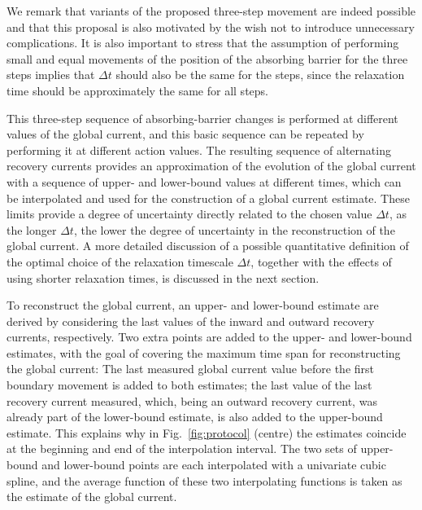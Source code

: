 We remark that variants of the proposed three-step movement are indeed possible and that this proposal is also motivated by the wish not to introduce unnecessary complications. It is also important to stress that the assumption of performing small and equal movements of the position of the absorbing barrier for the three steps implies that $\Delta t$ should also be the same for the steps, since the relaxation time should be approximately the same for all steps. 

This three-step sequence of absorbing-barrier changes is performed at different values of the global current, and this basic sequence can be repeated by performing it at different action values. The resulting sequence of alternating recovery currents provides an approximation of the evolution of the global current with a sequence of upper- and lower-bound values at different times, which can be interpolated and used for the construction of a global current estimate. These limits provide a degree of uncertainty directly related to the chosen value $\Delta t$, as the longer $\Delta t$, the lower the degree of uncertainty in the reconstruction of the global current. A more detailed discussion of a possible quantitative definition of the optimal choice of the relaxation timescale $\Delta t$, together with the effects of using shorter relaxation times, is discussed in the next section.

To reconstruct the global current, an upper- and lower-bound estimate are derived by considering the last values of the inward and outward recovery currents, respectively. Two extra points are added to the upper- and lower-bound estimates, with the goal of covering the maximum time span for reconstructing the global current: The last measured global current value before the first boundary movement is added to both estimates; the last value of the last recovery current measured, which, being an outward recovery current, was already part of the lower-bound estimate, is also added to the upper-bound estimate. This explains why in Fig.~\ref{fig:protocol} (centre) the estimates coincide at the beginning and end of the interpolation interval. The two sets of upper-bound and lower-bound points are each interpolated with a univariate cubic spline, and the average function of these two interpolating functions is taken as the estimate of the global current. 

